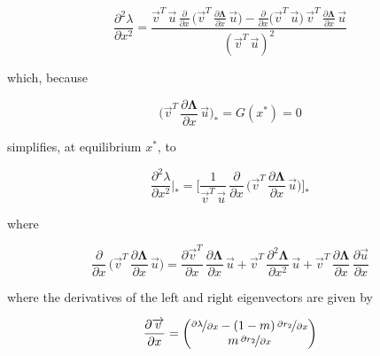 \begin{equation}
    \frac{\partial^2 \lambda}{\partial x^2} = \frac{\overrightarrow{v}^T\,\overrightarrow{u}\,\frac{\partial}{\partial x}\,\big(\overrightarrow{v}^T\,\frac{\partial \pmb{\Lambda}}{\partial x}\,\overrightarrow{u}\big) - \frac{\partial}{\partial x} \big( \overrightarrow{v}^T \, \overrightarrow{u} \big) \, \overrightarrow{v}^T \, \frac{\partial \pmb{\Lambda}}{\partial x}\,\overrightarrow{u}}{(\overrightarrow{v}^T\,\overrightarrow{u})^2}
\end{equation}

which, because

\begin{equation}
    \bigg( \overrightarrow{v}^T\,\frac{
    \partial \pmb \Lambda}{\partial x}\,\overrightarrow{u} \bigg)_* = G(x^*) = 0
\end{equation}

simplifies, at equilibrium $x^*$, to

\begin{equation}
    \frac{\partial^2 \lambda}{\partial x^2}\bigg|_* = \Bigg[ \frac{1}{\overrightarrow{v}^T\,\overrightarrow{u}}\,\frac{\partial}{\partial x}\,\bigg(\overrightarrow{v}^T\,\frac{\partial \pmb{\Lambda}}{\partial x}\,\overrightarrow{u}\bigg) \Bigg]_*
    \label{eq:fitness_curvature_equilibrium}
\end{equation}

where

\begin{equation}
    \frac{\partial}{\partial x} \, \bigg(\overrightarrow{v}^T \, \frac{\partial \pmb{\Lambda}}{\partial x} \, \overrightarrow{u}\bigg) = \frac{\partial \overrightarrow{v}^T}{\partial x}\,\frac{\partial \pmb{\Lambda}}{\partial x}\,\overrightarrow{u} + \overrightarrow{v}^T\,\frac{\partial^2 \pmb{\Lambda}}{\partial x^2}\,\overrightarrow{u} + \overrightarrow{v}^T\,\frac{\partial \pmb{\Lambda}}{\partial x}\,\frac{\partial \overrightarrow{u}}{\partial x}
    \label{eq:deriv_num_gradient_unevaluated}
\end{equation}

where the derivatives of the left and right eigenvectors are given by

\begin{equation}
    \frac{\partial \overrightarrow{v}}{\partial x} = 
    \begin{pmatrix}
        \nicefrac{\partial \lambda}{\partial x} - (1-m)\,\nicefrac{\partial r_2}{\partial x}\\
        m\,\nicefrac{\partial r_2}{\partial x}
    \end{pmatrix}
\end{equation}

